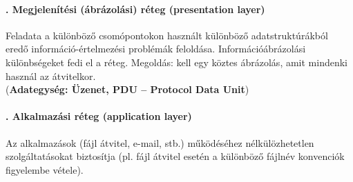 \paragraph[Megjelenítési réteg]{. Megjelenítési (ábrázolási) réteg (presentation layer)}
Feladata a különböző csomópontokon használt különböző adatstruktúrákból eredő információ-értelmezési problémák feloldása. Információábrázolási különbségeket fedi el a réteg. Megoldás: kell egy köztes ábrázolás, amit mindenki használ az átvitelkor.\\
(\textbf{Adategység: Üzenet, PDU -- Protocol Data Unit})
\paragraph[Alkalmazási réteg]{. Alkalmazási réteg (application layer)}
Az alkalmazások (fájl átvitel, e-mail, stb.) működéséhez nélkülözhetetlen szolgáltatásokat biztosítja (pl. fájl átvitel esetén a különböző fájlnév konvenciók figyelembe vétele).\\

